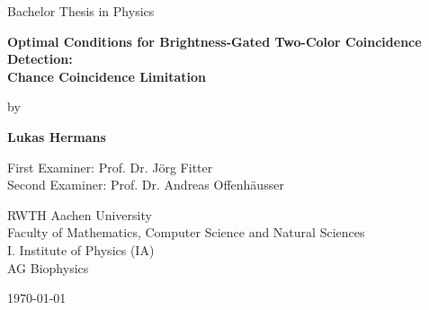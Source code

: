 \begin{titlepage}
	
		\centering
		
		\Large
		Bachelor Thesis in Physics
		
		\vspace*{2cm}
		
		\LARGE
		\textbf{Optimal Conditions for Brightness-Gated Two-Color Coincidence Detection:\\
				Chance Coincidence Limitation}
		
		\vspace*{2cm}
		
		\Large
		by
		
		\vspace*{0.5cm}
		
		\textbf{Lukas Hermans}
		
		\vfill
		
		\normalsize
		First Examiner: Prof. Dr. Jörg Fitter\\ 
		Second Examiner: Prof. Dr. Andreas Offenhäusser
		
		\vspace{1cm}
		
		RWTH Aachen University\\
		Faculty of Mathematics, Computer Science and Natural Sciences\\
		I. Institute of Physics (IA)\\
		AG Biophysics
			
		\vspace{1cm}
		
		\monthyeardate\today

\end{titlepage}